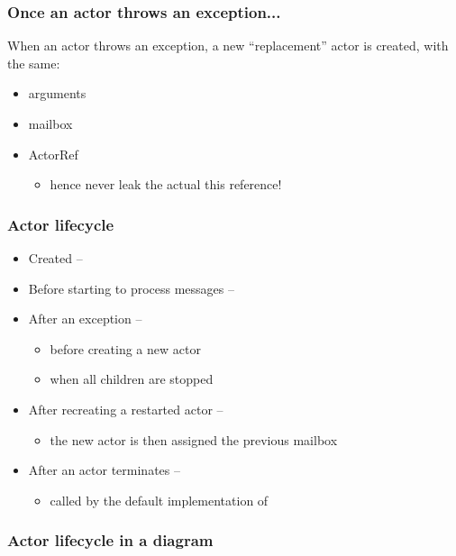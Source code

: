 \documentclass[aspectratio=169]{beamer}
\begin{document}
\begin{frame}\frametitle{Once an actor throws an exception...}
  When an actor throws an exception, a new \alert{``replacement'' actor} is created,
  with the same:
  \begin{itemize}
    \item arguments
    \item mailbox
    \item ActorRef
    \pause
      \begin{itemize}
        \item hence never leak the actual \alert{this} reference!
      \end{itemize}
  \end{itemize}
\end{frame}

\begin{frame}\frametitle{Actor lifecycle}

\begin{itemize}
  \item Created -- 
  \item Before starting to process messages -- 
  \item After an exception -- 
    \begin{itemize}
      \item before creating a new actor
      \item when all children are stopped
    \end{itemize}
  \item After recreating a restarted actor -- 
    \begin{itemize}
      \item the new actor is then assigned the previous mailbox
    \end{itemize}
  \item After an actor terminates -- 
    \begin{itemize}
      \item called by the default implementation of 
    \end{itemize}
\end{itemize}
\end{frame}

\begin{frame}\frametitle{Actor lifecycle in a diagram}
  \centering
\end{frame}
\end{document}
